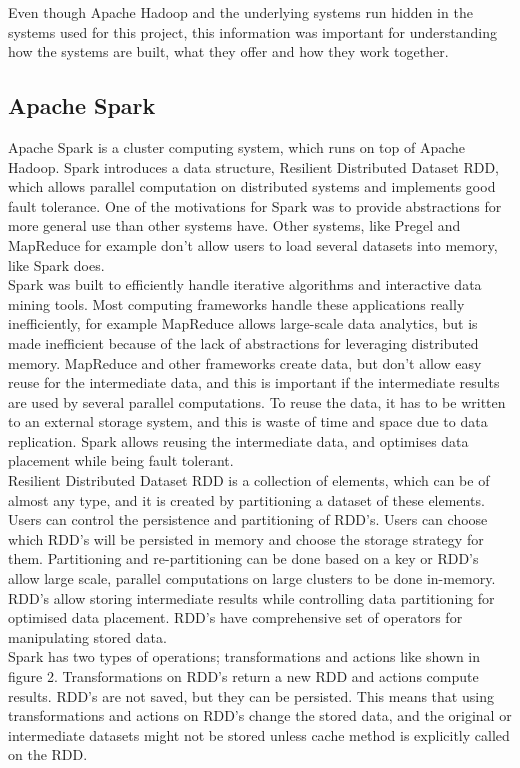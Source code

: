 \documentclass{article}
\theoremstyle{definition}
\begin{document}
Even though Apache Hadoop and the underlying systems run hidden in the systems used for this project, this information was important for understanding how the systems are built, what they offer and how they work together. 

\subsection{Apache Spark}
Apache Spark \cite{Zaharia2012} is a cluster computing system, which runs on top of Apache Hadoop. Spark introduces a data structure, Resilient Distributed Dataset RDD, which allows parallel computation on distributed systems and implements good fault tolerance. One of the motivations for Spark was to provide abstractions for more general use than other systems have. Other systems, like Pregel and MapReduce for example don't allow users to load several datasets into memory, like Spark does. \\

Spark was built to efficiently handle iterative algorithms and interactive data mining tools. Most computing frameworks handle these applications really inefficiently, for example MapReduce allows large-scale data analytics, but is made inefficient because of the lack of abstractions for leveraging distributed memory. MapReduce and other frameworks create data, but don't allow easy reuse for the intermediate data, and this is important if the intermediate results are used by several parallel computations. To reuse the data, it has to be written to an external storage system, and this is waste of time and space due to data replication. Spark allows reusing the intermediate data, and optimises data placement while being fault tolerant. \\ 

Resilient Distributed Dataset RDD is a collection of elements, which can be of almost any type, and it is created by partitioning a dataset of these elements. Users can control the persistence and partitioning of RDD's. Users can choose which RDD's will be persisted in memory and choose the storage strategy for them. Partitioning and re-partitioning can be done based on a key or RDD's allow large scale, parallel computations on large clusters to be done in-memory. RDD's allow storing intermediate results while controlling data partitioning for optimised data placement. RDD's have comprehensive set of operators for manipulating stored data.  \\

Spark has two types of operations; transformations and actions like shown in figure 2. Transformations on RDD's return a new RDD and actions compute results. RDD's are not saved, but they can be persisted. This means that using transformations and actions on RDD's change the stored data, and the original or intermediate datasets might not be stored unless cache method is explicitly called on the RDD.\\
\end{document}
